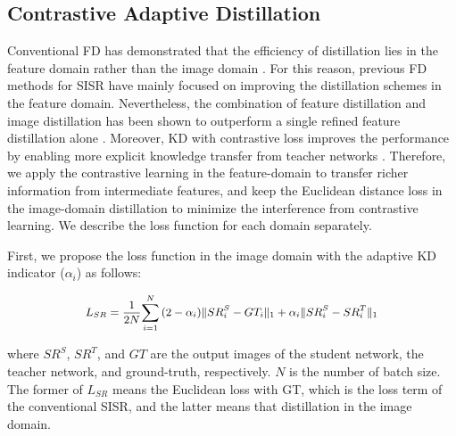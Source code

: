 \documentclass[10pt,twocolumn,letterpaper]{article}
\begin{document}
\subsection{Contrastive Adaptive Distillation }
\label{fcd}
Conventional FD has demonstrated that the efficiency of distillation lies in the feature domain rather than the image domain \cite{fakd}. For this reason, previous FD methods for SISR have mainly focused on improving the distillation schemes in the feature domain. Nevertheless, the combination of feature distillation and image distillation has been shown to outperform a single refined feature distillation alone \cite{fakd, lsfd}. Moreover, KD with contrastive loss improves the performance by enabling more explicit knowledge transfer from teacher networks \cite{csd2021}. Therefore, we apply the contrastive learning in the feature-domain to transfer richer information from intermediate features, and keep the Euclidean distance loss in the image-domain distillation to minimize the interference from contrastive learning. We describe the loss function for each domain separately.

First, we propose the loss function in the image domain with the adaptive KD indicator (\begin{math}\alpha_i\end{math}) as follows:

\begin{equation}
\small
\begin{aligned}
  L_{SR}= \frac{1}{2N}{\sum_{i=1}^{N}{(2-\alpha_i)\|SR_i^S-GT_i\|_1} + {\alpha_i\|SR_i^S-SR_i^T\|_1}}
\end{aligned}
\label{eq:loss_sr}
\end{equation}

where \begin{math}SR^S\end{math}, \begin{math}SR^T\end{math}, and \begin{math}GT\end{math} are the output images of the student network, the teacher network, and ground-truth, respectively. \begin{math}N\end{math} is the number of batch size. The former of \begin{math}L_{SR}\end{math} means the Euclidean loss with GT, which is the loss term of the conventional SISR, and the latter means that distillation in the image domain.
\end{document}
